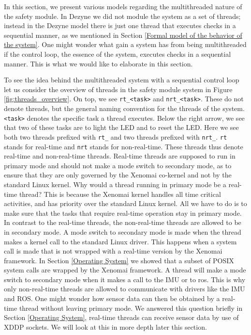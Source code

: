 \documentclass[12pt]{scrreprt}
\begin{document}
In this section, we present various models regarding the multithreaded nature of the safety module. In Dezyne we did not module the system as a set of threads; instead in the Dezyne model there is just one thread that executes checks in a sequential manner, as we mentioned in Section \ref{Formal model of the behavior of the system}. One might wonder what gain a system has from being multithreaded if the control loop, the essence of the system, executes checks in a sequential manner. This is what we would like to elaborate in this section.
\par
To see the idea behind the multithreaded system with a sequential control loop let us consider the overview of threads in the safety module system in Figure \ref{fig:threads_overview}. On top, we see \texttt{rt\_<task>} and \texttt{nrt\_<task>}. These do not denote threads, but the general naming convention for the threads of the system. \texttt{<task>} denotes the specific task a thread executes. Below the right arrow, we see that two of these tasks are to light the LED and to reset the LED. Here we see both two threads prefixed with \texttt{rt\_} and two threads prefixed with \texttt{nrt\_}. \texttt{rt} stands for real-time and \texttt{nrt} stands for non-real-time. These threads thus denote real-time and non-real-time threads. Real-time threads are supposed to run in primary mode and should not make a mode switch to secondary mode, as to ensure that they are only governed by the Xenomai co-kernel and not by the standard Linux kernel. Why would a thread running in primary mode be a real-time thread? This is because the Xenomai kernel handles all time critical activities, and has priority over the standard Linux kernel. All we have to do is to make sure that the tasks that require real-time operation stay in primary mode. In contrast to the real-time threads, the non-real-time threads are allowed to be in secondary mode. A mode switch to secondary mode is made when the thread makes a kernel call to the standard Linux driver. This happens when a system call is made that is not wrapped with a real-time version by the Xenomai framework. In Section \ref{Operating System} we showed that a subset of POSIX system calls are wrapped by the Xenomai framework. A thread will make a mode switch to secondary mode when it makes a call to the IMU or to \acrshort{ros}. This is why only non-real-time threads are allowed to communicate with drivers like the IMU and ROS. One might wonder how sensor data can then be obtained by a real-time thread without leaving primary mode. We answered this question briefly in Section \ref{Operating System}, real-time threads can receive sensor data by use of XDDP sockets. We will look at this in more depth later this section.
\end{document}
